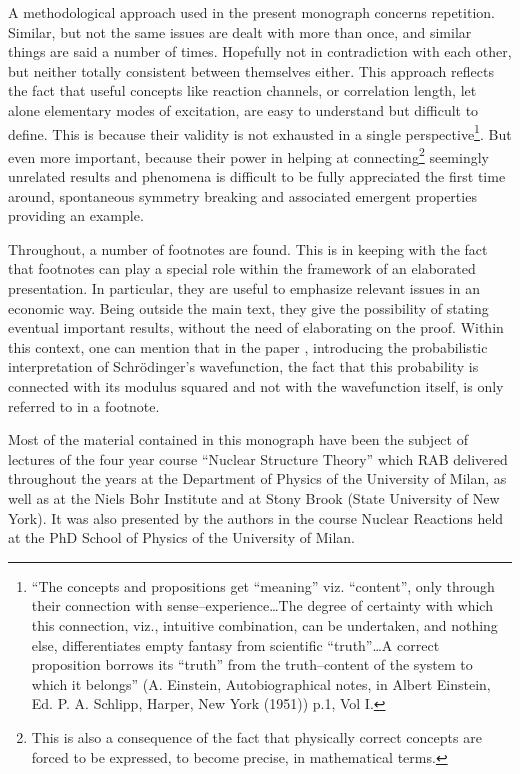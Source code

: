 A methodological approach used in the present monograph concerns repetition. Similar, but not the same issues are dealt with more than once, and similar things are said a number of times. Hopefully not in contradiction with each other, but neither totally consistent between themselves either. This approach reflects the fact that useful concepts like reaction channels, or correlation length, let alone elementary modes of excitation, are easy to understand but difficult to define. This is because their validity is not exhausted in a single perspective\footnote{``The concepts and propositions get ``meaning'' viz. ``content'', only through their connection with sense--experience\dots The degree of certainty with which this connection, viz., intuitive combination, can be undertaken, and nothing else, differentiates empty fantasy from scientific ``truth''\dots A correct proposition borrows its ``truth'' from the truth--content of the system to which it belongs'' (A. Einstein, Autobiographical notes, in Albert Einstein, Ed. P. A. Schlipp, Harper, New York (1951)) p.1, Vol I.}. But even more important, because their power in helping at connecting\footnote{This is also a consequence of the fact that physically correct concepts are forced to be expressed, to become precise, in mathematical terms.} seemingly unrelated results and phenomena is difficult to be fully appreciated the first time around, spontaneous symmetry breaking and associated emergent properties providing an example.


Throughout, a number of footnotes are found. This is in keeping with the fact that footnotes can play a special role within the framework of an elaborated presentation. In particular, they are useful to emphasize relevant issues in an economic way. Being outside the main text, they give the possibility of stating eventual important results, without the need of elaborating on the proof. Within this context, one can mention that in the paper  \cite{Born:26},  introducing the probabilistic interpretation of Schr\"odinger's  wavefunction, the fact that this probability is connected with its modulus squared and not with the wavefunction itself, is only referred to in a footnote.



  Most of the material contained in this monograph have been the subject of lectures of the four year course ``Nuclear Structure Theory'' which RAB delivered throughout the years at the Department of Physics of the University of Milan, as well as at the Niels Bohr Institute and at Stony Brook (State University of New York). It was also presented by the authors in the course Nuclear Reactions held at the PhD School of Physics of the University of Milan.

